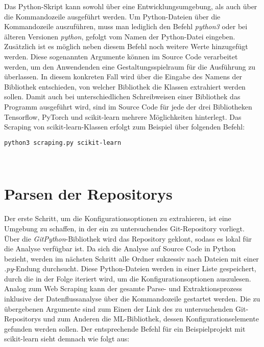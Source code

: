 \documentclass[german,bachelor]{swsLeipzig}
\begin{document}
\noindent Das Python-Skript kann sowohl über eine Entwicklungsumgebung, als auch über die Kommandozeile ausgeführt werden.
Um Python-Dateien über die Kommandozeile auszuführen, muss man lediglich den Befehl \textit{python3} oder bei älteren
Versionen \textit{python}, gefolgt vom Namen der Python-Datei eingeben.
Zusätzlich ist es möglich neben diesem Befehl noch weitere Werte hinzugefügt werden.
Diese sogenannten Argumente können im Source Code verarbeitet werden, um den Anwendenden eine Gestaltungsspielraum für
die Ausführung zu überlassen.
In diesem konkreten Fall wird über die Eingabe des Namens der Bibliothek entschieden, von welcher Bibliothek die
Klassen extrahiert werden sollen.
Damit auch bei unterschiedlichen Schreibweisen einer Bibliothek das Programm ausgeführt wird, sind im Source Code für jede
der drei Bibliotheken Tensorflow, PyTorch und scikit-learn mehrere Möglichkeiten hinterlegt.
Das Scraping von scikit-learn-Klassen erfolgt zum Beispiel über folgenden Befehl:\\

\noindent\begin{minipage}{\linewidth}
\begin{lstlisting}[language=bash, frame=single, label=scraping_scikit-learn, basicstyle=\small, caption={Kommandozeilenbefehl für das Web Scraping von scikit-learn},captionpos=b]
python3 scraping.py scikit-learn
\end{lstlisting}
\end{minipage}
\

\section{Parsen der Repositorys}
Der erste Schritt, um die Konfigurationsoptionen zu extrahieren, ist eine Umgebung zu schaffen, in der ein zu untersuchendes
Git-Repository vorliegt.
Über die \textit{GitPython}-Bibliothek wird das Repository geklont, sodass es lokal für die Analyse verfügbar ist.
Da sich die Analyse auf Source Code in Python bezieht, werden im nächsten Schritt alle Ordner sukzessiv nach Dateien mit
einer \textit{.py}-Endung durchsucht.
Diese Python-Dateien werden in einer Liste gespeichert, durch die in der Folge iteriert wird, um die Konfigurationsoptionen auszulesen. \\
\noindent Analog zum Web Scraping kann der gesamte Parse- und Extraktionsprozess inklusive der Datenflussanalyse über die Kommandozeile gestartet werden.
Die zu übergebenen Argumente sind zum Einen der Link des zu untersuchenden Git-Repositorys und zum Anderen die ML-Bibliothek, dessen
Konfigurationselemente gefunden werden sollen.
Der entsprechende Befehl für ein Beispielprojekt mit scikit-learn sieht demnach wie folgt aus: \\
\end{document}
